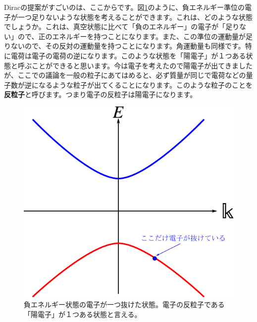 \documentclass[report,paper=a4, fontsize=12pt, line_length=16cm, number_of_lines=33,dvipdfmx]{jlreq}
\numberwithin{equation}{chapter}
\newcommand{\strong}[1]{{\sffamily \bfseries #1}}
\begin{document}
Diracの提案がすごいのは、ここからです。図\ref{fig:antiparticle}のように、負エネルギー準位の電子が一つ足りないような状態を考えることができます。これは、どのような状態でしょうか。これは、真空状態に比べて「負のエネルギー」の電子が「足りない」ので、正のエネルギーを持つことになります。また、この準位の運動量が足りないので、その反対の運動量を持つことになります。角運動量も同様です。特に電荷は電子の電荷の逆になります。このような状態を「陽電子」が１つある状態と呼ぶことができると思います。今は電子を考えたので陽電子が出てきましたが、ここでの議論を一般の粒子にあてはめると、必ず質量が同じで電荷などの量子数が逆になるような粒子が出てくることになります。このような粒子のことを\strong{反粒子}と呼びます。つまり電子の反粒子は陽電子になります。
\begin{figure}[htbp]
  \centering
  \includegraphics{antiparticle.pdf}
  \caption{負エネルギー状態の電子が一つ抜けた状態。電子の反粒子である「陽電子」が１つある状態と言える。}
  \label{fig:antiparticle}
\end{figure}
\end{document}
